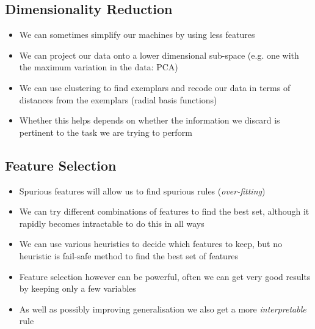 
\begin{slide}
\section{Dimensionality Reduction}

\begin{PauseHighLight}
  \begin{itemize}
  \item We can sometimes simplify our machines by using less features\pause
  \item We can project our data onto a lower dimensional sub-space
    (e.g. one with the maximum variation in the data: PCA)\pause
  \item We can use clustering to find exemplars and recode our data in
    terms of distances from the exemplars (radial basis
    functions)\pause
  \item Whether this helps depends on whether the information we discard
    is pertinent to the task we are trying to perform\pause
  \end{itemize}
\end{PauseHighLight}

\end{slide}




\begin{slide}
\section[-1]{Feature Selection}

\begin{PauseHighLight}
  \begin{itemize}
  \item Spurious features will allow us to find spurious rules
    (\emph{over-fitting})\pause
  \item We can try different combinations of features to find the best
    set, although it rapidly becomes intractable to do this in all
    ways\pause
  \item We can use various heuristics to decide which features to keep,
    but no heuristic is fail-safe method to find the best set of features\pause
  \item Feature selection however can be powerful, often we can get very
    good results by keeping only a few variables\pause
  \item As well as possibly improving generalisation we also get a more
    \emph{interpretable} rule\pause
  \end{itemize}
\end{PauseHighLight}

\end{slide}

